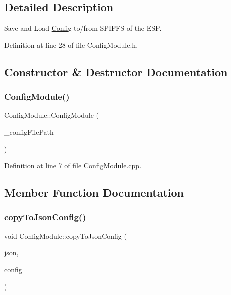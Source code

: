 \subsection{Detailed Description}
Save and Load \mbox{\hyperlink{struct_config}{Config}} to/from S\+P\+I\+F\+FS of the E\+SP. 

Definition at line 28 of file Config\+Module.\+h.



\subsection{Constructor \& Destructor Documentation}
\mbox{\label{class_config_module_a0f7c95e0a768a56c7f4ff835b09657b2}} 
\subsubsection{\texorpdfstring{ConfigModule()}{ConfigModule()}}
{\footnotesize\ttfamily Config\+Module\+::\+Config\+Module (\begin{DoxyParamCaption}\item[{String}]{\+\_\+config\+File\+Path }\end{DoxyParamCaption})}



Definition at line 7 of file Config\+Module.\+cpp.



\subsection{Member Function Documentation}
\mbox{\label{class_config_module_a19014d9b2ce8d8dee2333a52886d86d8}} 
\subsubsection{\texorpdfstring{copyToJsonConfig()}{copyToJsonConfig()}}
{\footnotesize\ttfamily void Config\+Module\+::copy\+To\+Json\+Config (\begin{DoxyParamCaption}\item[{Json\+Object \&}]{json,  }\item[{const \mbox{\hyperlink{struct_config}{Config}} \&}]{config }\end{DoxyParamCaption})\hspace{0.3cm}{\ttfamily [private]}}

